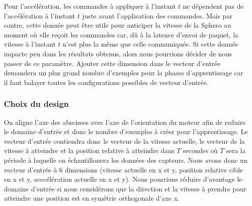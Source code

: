 Pour l'accélération, les commandes à appliquer à l'instant $t$ ne dépendent pas de l'accélération à l'instant $t$ juste avant l'application des commandes.
Mais par contre, cette donnée peut être utile pour anticiper la vitesse de la Sphero au moment où elle reçoit les commandes car, dû à la latence d'envoi de paquet, la vitesse à l'instant $t$ n'est plus la même que celle communiquée.
Si cette donnée impacte peu dans les résultats obtenus, alors nous pourrions décider de nous passer de ce paramètre.
Ajouter cette dimension dans le vecteur d'entrée demandera un plus grand nombre d'exemples pour la phases d'apprentissage car il faut balayer toutes les configurations possibles de vecteur d'entrée.

\newcommand{\inchist}[1]{
 \begin{minipage}{0.48\textwidth}
  \texttt{[image: ../figures/perf\#1.png]}
 \end{minipage}
}
\newcommand{\incbefore}[1]{
 \begin{minipage}{0.48\textwidth}
  \texttt{[image: ../figures/perf\#1Before.png]}
 \end{minipage}
}
\subsubsection{Choix du design}\label{sec:choixdesign}
On aligne l'axe des abscisses avec l'axe de l'orientation du moteur afin de reduire le domaine d'entrée et donc le nombre d'exemples à créer pour l'apprentissage.
Le vecteur d'entrée contiendra donc le vecteur de la vitesse actuelle, le vecteur de la vitesse à atteindre et la position relative à atteindre dans $T$ secondes où $T$ sera la période à laquelle on échantillonera les données des capteurs.
Nous avons donc un vecteur d'entrée à 6 dimensions (vitesse actuelle en x et y, position relative cible en x et y, acccélération actuelle en x et y).
Nous pourrions réduire d'avantage le domaine d'entrée si nous considérons que la direction et la vitesse à prendre pour atteindre une position est en symétrie orthogonale d'axe x.


